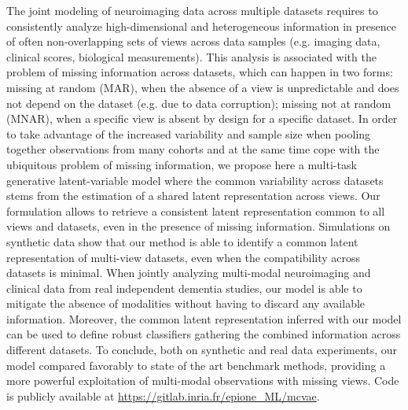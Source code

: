 The joint modeling of neuroimaging data across multiple datasets requires to consistently analyze high-dimensional and heterogeneous information in presence of often non-overlapping sets of views across data samples (e.g. imaging data, clinical scores, biological measurements).
This analysis is associated with the problem of missing information across datasets, which can happen in two forms:
missing at random (MAR), when the absence of a view is unpredictable and does not depend on the dataset (e.g. due to data corruption);
missing not at random (MNAR), when a specific view is absent by design for a specific dataset.
%
In order to take advantage of the increased variability and sample size when pooling together observations from many cohorts
and at the same time cope with the ubiquitous problem of missing information,
we propose here a multi-task generative latent-variable model where the common variability across datasets stems from the estimation of a shared latent representation across views.
Our formulation allows to retrieve a consistent latent representation common to all views and datasets, even in the presence of missing information.
%
Simulations on synthetic data show that our method is able to identify a common latent representation of multi-view datasets, even when the compatibility across datasets is minimal.
%
When jointly analyzing multi-modal neuroimaging and clinical data from real independent dementia studies, our model is able to mitigate the absence of modalities without having to discard any available information.
Moreover, the common latent representation inferred with our model can be used to define robust classifiers gathering the combined information across different datasets.
%
To conclude, both on synthetic and real data experiments, our model compared favorably to state of the art benchmark methods, providing a more powerful exploitation of multi-modal observations with missing views.
%
Code is publicly available at \url{https://gitlab.inria.fr/epione\_ML/mcvae}.
